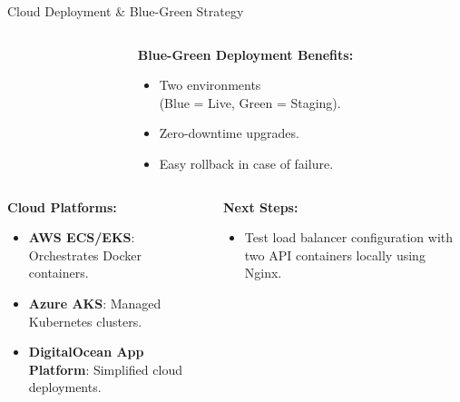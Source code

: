\documentclass[notes]{beamer}
\begin{document}
{\begin{frame}{Cloud Deployment \& Blue-Green Strategy}
\begin{columns}[T]
\begin{column}{0.5\textwidth}
{
            }
        \end{column}
        
        \begin{column}{0.52\textwidth}
            \textbf{Blue-Green Deployment Benefits:}
            \begin{itemize}
                \item Two environments \\(Blue = Live, Green = Staging).
                \item Zero-downtime upgrades.
                \item Easy rollback in case of failure.
            \end{itemize}
        \end{column}
    \end{columns}
    
    \vspace{1cm} %

    \begin{columns}[T]
        \begin{column}{0.65\textwidth}
            \textbf{Cloud Platforms:}
            \begin{itemize}
                \item \textbf{AWS ECS/EKS}: Orchestrates Docker containers.
                \item \textbf{Azure AKS}: Managed Kubernetes clusters.
                \item \textbf{DigitalOcean App Platform}: Simplified cloud deployments.
            \end{itemize}
        \end{column}

        \hspace{0.1em}

        \begin{column}{0.35\textwidth}
            \textbf{Next Steps:}
            \begin{itemize}
                \item Test load balancer configuration with two API containers locally using Nginx.
            \end{itemize}
        \end{column}
    \end{columns}
        

\end{frame}}
\end{document}
